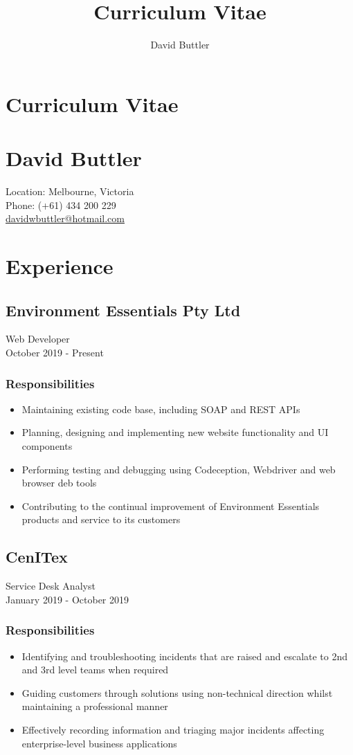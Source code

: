 \documentclass[a4paper, 12pt]{article}
\title{Curriculum Vitae}
\author{David Buttler}
\begin{document}
	\begin{center}
	\section*{Curriculum Vitae}	
	\section*{David Buttler}
		Location: Melbourne, Victoria\\
		Phone: (+61) 434 200 229\\
		\href{mailto:davidwbuttler@hotmail.com}{davidwbuttler@hotmail.com}
	\end{center}
	\section*{Experience}
	\subsection*{Environment Essentials Pty Ltd}
		Web Developer\\
		October 2019 - Present
	\subsubsection*{Responsibilities}
	\begin{itemize}
		\item Maintaining existing code base, including SOAP and REST APIs
		\item Planning, designing and implementing new website functionality and UI components
		\item Performing testing and debugging using Codeception, Webdriver and web browser deb tools
		\item Contributing to the continual improvement of Environment Essentials products and service to its customers
	\end{itemize}
	\subsection*{CenITex}
		Service Desk Analyst\\
		January 2019 - October 2019
	\subsubsection*{Responsibilities}
	\begin{itemize}
		\item Identifying and troubleshooting incidents that are raised and escalate to 2nd and 3rd level teams when required
		\item Guiding customers through solutions using non-technical direction whilst maintaining a professional manner
		\item Effectively recording information and triaging major incidents affecting enterprise-level business applications 
	\end{itemize}
\end{document}

